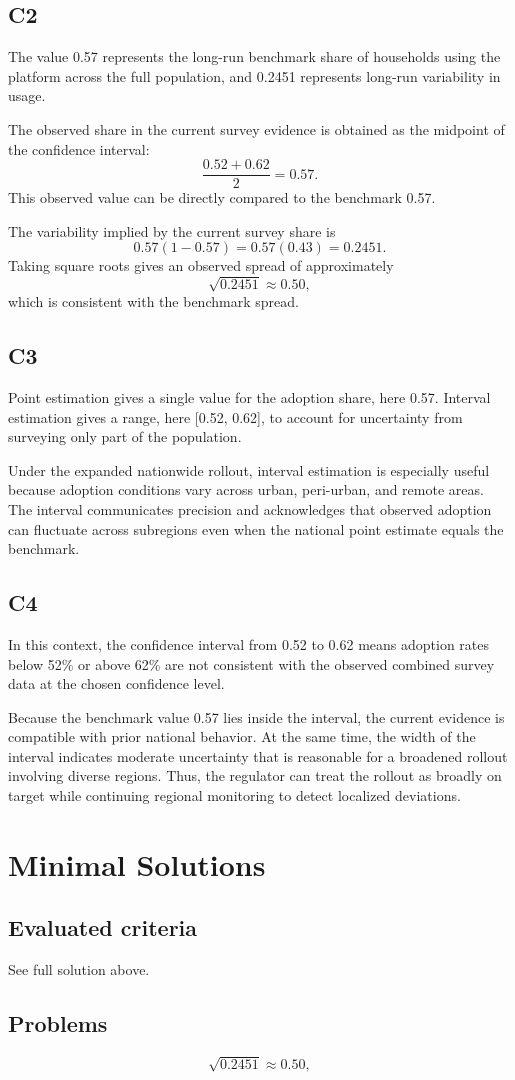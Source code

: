 \begin{ExamProblems}
		\subsection*{C2}
		The value 0.57 represents the long-run benchmark share of households using the platform across the full population, and 0.2451 represents long-run variability in usage.
		
		The observed share in the current survey evidence is obtained as the midpoint of the confidence interval:
		\[
		\frac{0.52 + 0.62}{2} = 0.57.
		\]
		This observed value can be directly compared to the benchmark 0.57.
		
		The variability implied by the current survey share is
		\[
		0.57(1-0.57) = 0.57(0.43) = 0.2451.
		\]
		Taking square roots gives an observed spread of approximately
		\[
		\sqrt{0.2451} \approx 0.50,
		\]
		which is consistent with the benchmark spread.
		
		\subsection*{C3}
		Point estimation gives a single value for the adoption share, here 0.57. Interval estimation gives a range, here [0.52, 0.62], to account for uncertainty from surveying only part of the population.
		
		Under the expanded nationwide rollout, interval estimation is especially useful because adoption conditions vary across urban, peri-urban, and remote areas. The interval communicates precision and acknowledges that observed adoption can fluctuate across subregions even when the national point estimate equals the benchmark.
		
		\subsection*{C4}
		In this context, the confidence interval from 0.52 to 0.62 means adoption rates below 52\% or above 62\% are not consistent with the observed combined survey data at the chosen confidence level.
		
		Because the benchmark value 0.57 lies inside the interval, the current evidence is compatible with prior national behavior. At the same time, the width of the interval indicates moderate uncertainty that is reasonable for a broadened rollout involving diverse regions. Thus, the regulator can treat the rollout as broadly on target while continuing regional monitoring to detect localized deviations.
		
	\end{ExamProblems}


\section{Minimal Solutions}

\subsection*{Evaluated criteria}
See full solution above.

\subsection*{Problems}
\[\sqrt{0.2451} \approx 0.50,\]


